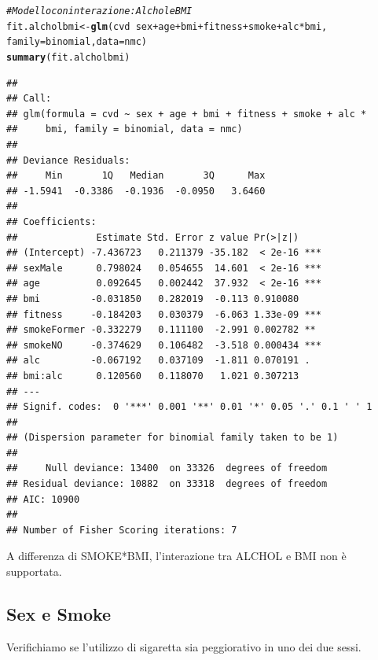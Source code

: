 \documentclass{article}\usepackage[]{graphicx}\usepackage[]{xcolor}
\makeatletter
\newcommand{\hlcom}[1]{\textcolor[rgb]{0.678,0.584,0.686}{\textit{#1}}}%
\newcommand{\hlopt}[1]{\textcolor[rgb]{0,0,0}{#1}}%
\newcommand{\hlstd}[1]{\textcolor[rgb]{0.345,0.345,0.345}{#1}}%
\newcommand{\hlkwb}[1]{\textcolor[rgb]{0.69,0.353,0.396}{#1}}%
\newcommand{\hlkwc}[1]{\textcolor[rgb]{0.333,0.667,0.333}{#1}}%
\newcommand{\hlkwd}[1]{\textcolor[rgb]{0.737,0.353,0.396}{\textbf{#1}}}%
\newenvironment{kframe}{%
 \def\at@end@of@kframe{}%
 \ifinner\ifhmode%
  \def\at@end@of@kframe{\end{minipage}}%
  \begin{minipage}{\columnwidth}%
 \fi\fi%
 \def\FrameCommand##1{\hskip\@totalleftmargin \hskip-\fboxsep
 \colorbox{shadecolor}{##1}\hskip-\fboxsep
     \hskip-\linewidth \hskip-\@totalleftmargin \hskip\columnwidth}%
 \MakeFramed {\advance\hsize-\width
   \@totalleftmargin\z@ \linewidth\hsize
   \@setminipage}}%
 {\par\unskip\endMakeFramed%
 \at@end@of@kframe}
\newenvironment{knitrout}{}{} %
\makeatother
\begin{document}
\begin{knitrout}
\color{fgcolor}\begin{kframe}
\begin{alltt}
\hlcom{#Modello con interazione: Alchol e BMI}
\hlstd{fit.alcholbmi} \hlkwb{<-} \hlkwd{glm}\hlstd{(cvd}\hlopt{~}\hlstd{sex}\hlopt{+}\hlstd{age}\hlopt{+}\hlstd{bmi}\hlopt{+}\hlstd{fitness}\hlopt{+}\hlstd{smoke}\hlopt{+}\hlstd{alc}\hlopt{*}\hlstd{bmi,}
                     \hlkwc{family}\hlstd{=binomial,} \hlkwc{data}\hlstd{=nmc)}
\hlkwd{summary}\hlstd{(fit.alcholbmi)}
\end{alltt}
\begin{verbatim}
## 
## Call:
## glm(formula = cvd ~ sex + age + bmi + fitness + smoke + alc * 
##     bmi, family = binomial, data = nmc)
## 
## Deviance Residuals: 
##     Min       1Q   Median       3Q      Max  
## -1.5941  -0.3386  -0.1936  -0.0950   3.6460  
## 
## Coefficients:
##              Estimate Std. Error z value Pr(>|z|)    
## (Intercept) -7.436723   0.211379 -35.182  < 2e-16 ***
## sexMale      0.798024   0.054655  14.601  < 2e-16 ***
## age          0.092645   0.002442  37.932  < 2e-16 ***
## bmi         -0.031850   0.282019  -0.113 0.910080    
## fitness     -0.184203   0.030379  -6.063 1.33e-09 ***
## smokeFormer -0.332279   0.111100  -2.991 0.002782 ** 
## smokeNO     -0.374629   0.106482  -3.518 0.000434 ***
## alc         -0.067192   0.037109  -1.811 0.070191 .  
## bmi:alc      0.120560   0.118070   1.021 0.307213    
## ---
## Signif. codes:  0 '***' 0.001 '**' 0.01 '*' 0.05 '.' 0.1 ' ' 1
## 
## (Dispersion parameter for binomial family taken to be 1)
## 
##     Null deviance: 13400  on 33326  degrees of freedom
## Residual deviance: 10882  on 33318  degrees of freedom
## AIC: 10900
## 
## Number of Fisher Scoring iterations: 7
\end{verbatim}
\end{kframe}
\end{knitrout}
    
    A differenza di SMOKE*BMI, l'interazione tra ALCHOL e BMI non è supportata.
  
  \subsection{Sex e Smoke}
    Verifichiamo se l'utilizzo di sigaretta sia peggiorativo in uno dei due 
    sessi.
    
\end{document}
